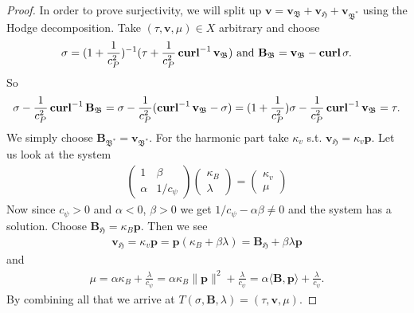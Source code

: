 \documentclass[../master_thesis.tex]{subfiles}
\begin{document}
\begin{proof}
    In order to prove surjectivity, we will split up $\mathbf{v} = \mathbf{v}_\mathfrak{B}
    + \mathbf{v}_\mathfrak{H} + \mathbf{v}_\mathfrak{B^*}$ using the Hodge decomposition.
    Take $(\tau, \mathbf{v},\mu) \in X$ arbitrary and 
    choose 
    \begin{align*}
        \sigma = (1+\frac{1}{c_P^2})^{-1} (\tau + \frac{1}{c_P^2} \veccurl^{-1} \mathbf{v}_\mathfrak{B}) 
        \text{ and }\mathbf{B}_\mathfrak{B} = \mathbf{v}_\mathfrak{B} - \veccurl \sigma.
    \end{align*}
    So 
    \begin{align*}
        \sigma -  \frac{1}{c_P^2} \veccurl^{-1}\mathbf{B}_\mathfrak{B} 
        = \sigma -  \frac{1}{c_P^2} (\veccurl^{-1} \mathbf{v}_\mathfrak{B} - \sigma)
        = (1+\frac{1}{c_P^2})\sigma - \frac{1}{c_P^2} \veccurl^{-1} \mathbf{v}_\mathfrak{B}
        = \tau.
    \end{align*}
    We simply choose $\mathbf{B}_\mathfrak{B^*} = \mathbf{v}_\mathfrak{B^*}$.
    For the harmonic part take $\kappa_v$ s.t. $\mathbf{v}_\mathfrak{H} = \kappa_v \mathbf{p}$.
    Let us look at the system 
    \begin{align*}
        \begin{pmatrix}
            1 & \beta 
            \\ \alpha & 1/c_\psi
        \end{pmatrix}
        \begin{pmatrix}
            \kappa_B 
            \\ \lambda 
        \end{pmatrix}
        = 
        \begin{pmatrix}
            \kappa_v 
            \\ \mu
        \end{pmatrix}
    \end{align*}
    Now since $c_\psi > 0$ and $\alpha < 0$, $\beta > 0$ we get 
    $1/c_\psi - \alpha \beta \neq 0$ and the system has a solution. 
    Choose $\mathbf{B}_\mathfrak{H} = \kappa_B \mathbf{p}$.
    Then we see 
    \begin{align*}
        \mathbf{v}_\mathfrak{H} = \kappa_v \mathbf{p} = \mathbf{p}(\kappa_B + \beta \lambda) 
        =  \mathbf{B}_\mathfrak{H} + \beta \lambda \mathbf{p}
    \end{align*}
    and 
    \begin{align*}
        \mu = \alpha \kappa_B + \frac{\lambda}{c_\psi}
        = \alpha \kappa_B \lVert \mathbf{p} \rVert^2 + \frac{\lambda}{c_\psi}
        = \alpha \langle \mathbf{B}, \mathbf{p} \rangle + \frac{\lambda}{c_\psi}.
    \end{align*}
    By combining all that we arrive at 
    $T(\sigma,\mathbf{B}, \lambda) = (\tau, \mathbf{v}, \mu)$.
\end{proof}
\end{document}
